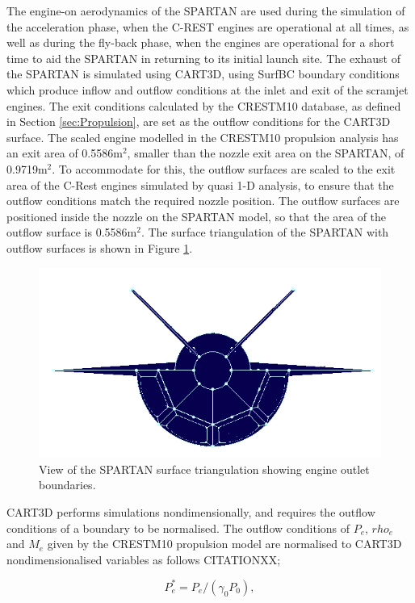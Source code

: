 		The engine-on aerodynamics of the SPARTAN are used during the simulation of the acceleration phase, when the C-REST engines are operational at all times, as well as during the fly-back phase, when the engines are operational for a short time to aid the SPARTAN in returning to its initial launch site. 		
		The exhaust of the SPARTAN is simulated using CART3D, using SurfBC boundary conditions which produce inflow and outflow conditions at the inlet and exit of the scramjet engines\cite{Pandya2004}. The exit conditions calculated by the CRESTM10 database, as defined in Section \ref{sec:Propulsion}, are set as the outflow conditions for the CART3D surface. The scaled engine modelled in the CRESTM10 propulsion analysis has an exit area of 0.5586m$^2$, smaller than the nozzle exit area on the SPARTAN, of 0.9719m$^2$. 
		 To accommodate for this, the outflow surfaces are scaled to the exit area of the C-Rest engines simulated by quasi 1-D analysis, to ensure that the outflow conditions match the required nozzle position. The outflow surfaces are positioned inside the nozzle on the SPARTAN model, so that the area of the outflow surface is 0.5586m$^2$. The surface triangulation of the SPARTAN with outflow surfaces is shown in Figure \ref{fig:Pointwise-EngineBC}.
				\begin{figure}[ht]
					\centering
					\includegraphics[width=0.7\linewidth]{figures/3_vehicle_design/Pointwise-EngineBC}
					\caption{View of the SPARTAN surface triangulation showing engine outlet boundaries.}
					\label{fig:Pointwise-EngineBC}
				\end{figure}
		 CART3D performs simulations nondimensionally, and requires the outflow conditions of a boundary to be normalised. The outflow conditions of $P_e$, $rho_e$ and $M_e$ given by the CRESTM10 propulsion model are normalised to CART3D nondimensionalised variables as follows CITATIONXX;
		
		\begin{equation}
		P_e^* = P_e/(\gamma_0 P_0),
		\end{equation}
		
